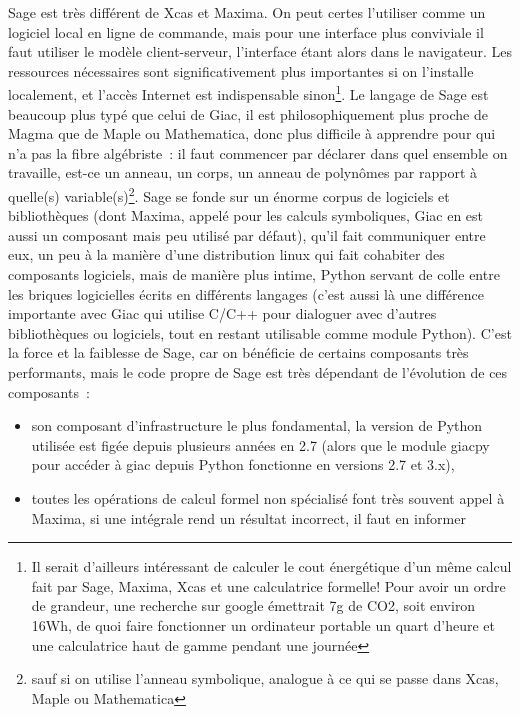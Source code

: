 \documentclass[a4paper,11pt]{book}
\begin{document}
\begin{giacjshere}
Sage est tr\`es diff\'erent de Xcas et Maxima. On peut certes l'utiliser
comme un logiciel local en ligne de commande, mais
pour une interface plus conviviale il faut utiliser le mod\`ele
client-serveur, l'interface \'etant alors dans le navigateur. Les
ressources n\'ecessaires sont significativement plus importantes
si on l'installe localement, et l'acc\`es Internet est indispensable
sinon\footnote{Il serait d'ailleurs int\'eressant de calculer le 
cout \'energ\'etique d'un m\^eme calcul fait par Sage, Maxima, 
Xcas et une calculatrice formelle! Pour avoir un ordre
de grandeur, une recherche sur google \'emettrait 7g de CO2, 
soit environ 16Wh, de quoi faire fonctionner un ordinateur 
portable un quart d'heure et une calculatrice haut de gamme
pendant une journ\'ee}. Le langage de 
Sage est beaucoup plus typ\'e que celui de Giac, il est
philosophiquement
plus proche de Magma que de Maple ou Mathematica,
donc plus difficile \`a apprendre pour qui n'a pas la fibre 
alg\'ebriste~: il faut commencer par d\'eclarer dans quel
ensemble on travaille, est-ce un anneau, un corps, un anneau
de polyn\^omes par rapport \`a quelle(s) variable(s)\footnote{sauf si
on utilise l'anneau symbolique, analogue \`a ce qui se passe
dans Xcas, Maple ou Mathematica}.
Sage se fonde sur un \'enorme corpus de logiciels et
biblioth\`eques (dont Maxima, appel\'e pour les calculs symboliques,
Giac en est aussi un composant mais peu utilis\'e par d\'efaut), 
qu'il fait communiquer entre eux, un peu \`a la
mani\`ere d'une distribution linux qui fait cohabiter des composants
logiciels, mais de mani\`ere plus intime, Python servant
de colle entre les briques logicielles \'ecrits en diff\'erents
langages (c'est aussi l\`a une diff\'erence importante avec Giac
qui utilise C/C++ pour dialoguer avec d'autres biblioth\`eques
ou logiciels, tout en restant utilisable comme module
Python). C'est la force et la
faiblesse de Sage, car on b\'en\'eficie de certains composants tr\`es
performants, mais le code propre de Sage est tr\`es d\'ependant
de l'\'evolution de ces composants~:
\begin{itemize}
\item son composant d'infrastructure le plus fondamental, 
la version de Python utilis\'ee est
fig\'ee depuis plusieurs ann\'ees en 2.7 (alors que le module
giacpy pour acc\'eder \`a giac depuis Python fonctionne
en versions 2.7 et 3.x),
\item toutes les op\'erations de calcul formel non
sp\'ecialis\'e font tr\`es souvent appel \`a Maxima,
si une int\'egrale rend un r\'esultat incorrect, il faut en informer

\end{itemize}
\end{giacjshere}
\end{document}
